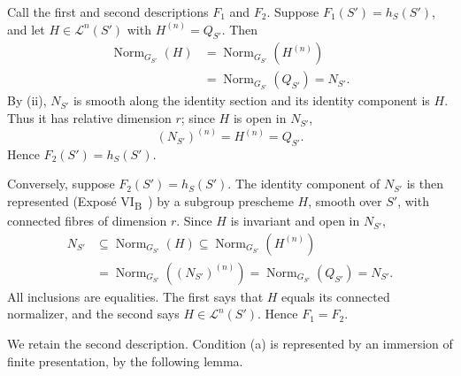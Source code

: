 Call the first and second descriptions \(F_1\) and \(F_2\).
Suppose \(F_1(S')=h_S(S')\), and let \(H\in\mathcal L^n(S')\) with
\(H^{(n)}=Q_{S'}\). Then
\[
\begin{aligned}
\operatorname{Norm}_{G_{S'}}(H)
 &=\operatorname{Norm}_{G_{S'}}(H^{(n)})\\
 &=\operatorname{Norm}_{G_{S'}}(Q_{S'})
 =N_{S'}.
\end{aligned}
\]
By (ii), \(N_{S'}\) is smooth along the identity
section and its identity component is \(H\). Thus it has relative
dimension \(r\); since \(H\) is open in \(N_{S'}\),
\[
  (N_{S'})^{(n)}=H^{(n)}=Q_{S'}.
\]
Hence \(F_2(S')=h_S(S')\).

Conversely, suppose \(F_2(S')=h_S(S')\). The identity component of
\(N_{S'}\) is then represented (Exposé VI\textsubscript{B}~) by
a subgroup prescheme \(H\), smooth over \(S'\), with connected fibres
of dimension \(r\). Since \(H\) is invariant and open in \(N_{S'}\),
\[
\begin{aligned}
N_{S'}&\subseteq\operatorname{Norm}_{G_{S'}}(H)
\subseteq\operatorname{Norm}_{G_{S'}}(H^{(n)})\\
&=\operatorname{Norm}_{G_{S'}}((N_{S'})^{(n)})
=\operatorname{Norm}_{G_{S'}}(Q_{S'})=N_{S'}.
\end{aligned}
\]
All inclusions are equalities. The first says that \(H\) equals its
connected normalizer, and the second says
\(H\in\mathcal L^n(S')\). Hence \(F_1=F_2\).

We retain the second description. Condition (a) is represented by an
immersion of finite presentation, by the following lemma.


